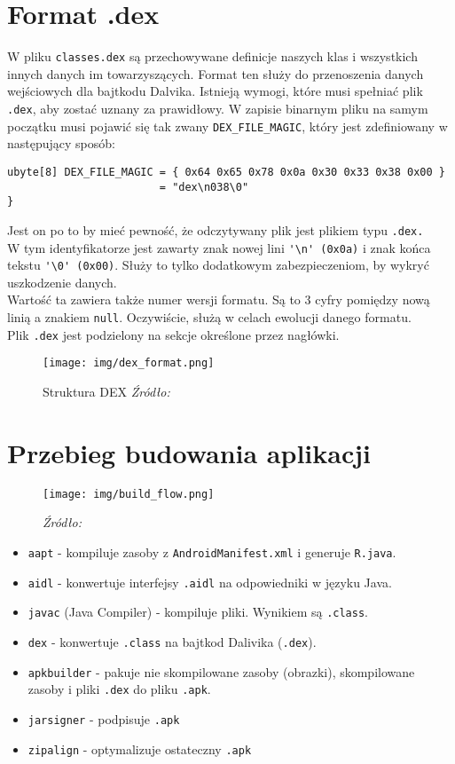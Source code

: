 \documentclass[12pt,a4paper,leqno,oneside,titlepage]{book}
\begin{document}
\section{Format .dex}
%
W pliku \verb|classes.dex| są przechowywane definicje naszych klas\cite{AndroidSourceDexFormat} i wszystkich innych danych im towarzyszących.
Format ten służy do przenoszenia danych wejściowych dla bajtkodu Dalvika.
Istnieją wymogi\cite{DalvikConstrains}, które musi spełniać plik \verb|.dex|, aby zostać uznany za prawidłowy.
%
W zapisie binarnym pliku na samym początku musi pojawić się tak zwany \verb|DEX_FILE_MAGIC|, który jest zdefiniowany w następujący sposób:\cite{AndroidSourceDexFormat}
\begin{lstlisting}
ubyte[8] DEX_FILE_MAGIC = { 0x64 0x65 0x78 0x0a 0x30 0x33 0x38 0x00 }
                        = "dex\n038\0"
}
\end{lstlisting}
Jest on po to by mieć pewność, że odczytywany plik jest plikiem typu \verb|.dex.|\\
W tym identyfikatorze jest zawarty znak nowej lini \verb|'\n' (0x0a)| i znak końca tekstu \verb|'\0' (0x00)|. Służy to tylko dodatkowym zabezpieczeniom, by wykryć uszkodzenie danych.
\\
Wartość ta zawiera także numer wersji formatu. Są to 3 cyfry pomiędzy nową linią a znakiem \verb|null|. Oczywiście, służą w celach ewolucji danego formatu.
\\
Plik \verb|.dex| jest podzielony na sekcje określone przez nagłówki\cite{AndroidSourceDexFormat}.
%
\begin{figure}[H]
	\centering
	\texttt{[image: img/dex\_format.png]}
	\caption{Struktura DEX \emph{Źródło: \cite{DiveIntoDex}}}
\end{figure}
%
%
\section{Przebieg budowania aplikacji}
\label{prepare_process}
%
\begin{figure}[H]
	\centering
	\texttt{[image: img/build\_flow.png]}
	\caption{\emph{Źródło: \cite{GradleBuildProcess}}}
\end{figure}
%
\begin{itemize}
\item \verb|aapt| - kompiluje zasoby z \verb|AndroidManifest.xml| i generuje \verb|R.java|.
%
\item \verb|aidl| - konwertuje interfejsy \verb|.aidl| na odpowiedniki w języku Java.
%
\item \verb|javac| (Java Compiler) - kompiluje pliki. Wynikiem są \verb|.class|.
%
\item \verb|dex| - konwertuje \verb|.class| na bajtkod Dalivika (\verb|.dex|).
%
\item \verb|apkbuilder| - pakuje nie skompilowane zasoby (obrazki), skompilowane zasoby i pliki \verb|.dex| do pliku \verb|.apk|.
%
\item \verb|jarsigner| - podpisuje \verb|.apk|
%
\item \verb|zipalign| - optymalizuje ostateczny \verb|.apk|
\end{itemize}
%
%
\end{document}
